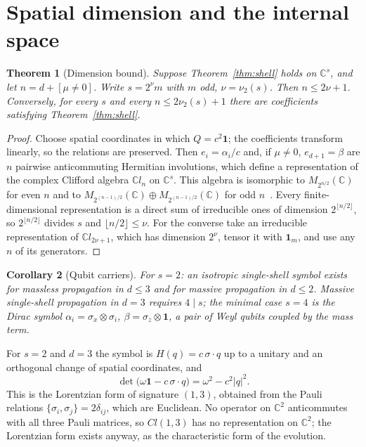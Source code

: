 \documentclass[12pt]{article}
\newtheorem{theorem}{Theorem}
\newtheorem{corollary}[theorem]{Corollary}
\theoremstyle{definition}
\theoremstyle{remark}
\begin{document}
\section{Spatial dimension and the internal space}
\label{sec:dimension}

\begin{theorem}[Dimension bound]
\label{thm:dimension}
Suppose Theorem~\ref{thm:shell} holds on $\mathbb C^s$, and let $n=d+[\mu\neq0]$. Write $s=2^{\nu}m$ with $m$ odd, $\nu=\nu_2(s)$. Then $n\le2\nu+1$. Conversely, for every $s$ and every $n\le2\nu_2(s)+1$ there are coefficients satisfying Theorem~\ref{thm:shell}.
\end{theorem}

\begin{proof}
Choose spatial coordinates in which $Q=c^2\mathbf 1$; the coefficients transform linearly, so the relations are preserved. Then $e_i=\alpha_i/c$ and, if $\mu\ne0$, $e_{d+1}=\beta$ are $n$ pairwise anticommuting Hermitian involutions, which define a representation of the complex Clifford algebra $\mathbb{C}l_n$ on $\mathbb C^s$. This algebra is isomorphic to $M_{2^{n/2}}(\mathbb C)$ for even $n$ and to $M_{2^{(n-1)/2}}(\mathbb C)\oplus M_{2^{(n-1)/2}}(\mathbb C)$ for odd $n$~\cite{LawsonMichelsohn1989}. Every finite-dimensional representation is a direct sum of irreducible ones of dimension $2^{\lfloor n/2\rfloor}$, so $2^{\lfloor n/2\rfloor}$ divides $s$ and $\lfloor n/2\rfloor\le\nu$. For the converse take an irreducible representation of $\mathbb{C}l_{2\nu+1}$, which has dimension $2^\nu$, tensor it with $\mathbf 1_m$, and use any $n$ of its generators.
\end{proof}

\begin{corollary}[Qubit carriers]
\label{cor:qubit}
For $s=2$: an isotropic single-shell symbol exists for massless propagation in $d\le3$ and for massive propagation in $d\le2$. Massive single-shell propagation in $d=3$ requires $4\mid s$; the minimal case $s=4$ is the Dirac symbol $\alpha_i=\sigma_x\otimes\sigma_i$, $\beta=\sigma_z\otimes\mathbf 1$, a pair of Weyl qubits coupled by the mass term.
\end{corollary}

For $s=2$ and $d=3$ the symbol is $H(q)=c\,\sigma\cdot q$ up to a unitary and an orthogonal change of spatial coordinates, and
\begin{equation}
\det\bigl(\omega\mathbf 1-c\,\sigma\cdot q\bigr)=\omega^2-c^2|q|^2 .
\label{eq:weyl}
\end{equation}
This is the Lorentzian form of signature $(1,3)$, obtained from the Pauli relations $\{\sigma_i,\sigma_j\}=2\delta_{ij}$, which are Euclidean. No operator on $\mathbb C^2$ anticommutes with all three Pauli matrices, so $Cl(1,3)$ has no representation on $\mathbb C^2$; the Lorentzian form exists anyway, as the characteristic form of the evolution.
\end{document}
